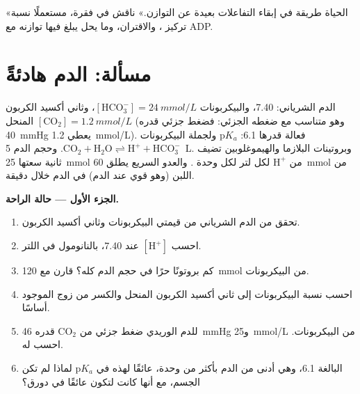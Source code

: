 \begin{exercise}[$\star\star\star$]\label{exo:b1:water-small-molecules:12}
«الحياة طريقة في إبقاء التفاعلات بعيدة عن التوازن.» ناقش في فقرة،
مستعملًا نسبة تركيز ، والاقتران، وما يحل  يبلغ  فيها
توازنه مع ADP.
\end{exercise}

\section{مسألة: الدم هادئةً}

\begin{problem}
\label{pb:b1:water-small-molecules:1}
الدم الشرياني:  7.40، والبيكربونات
$[\mathrm{HCO_3^-}] =
\qty{24}{mmol/L}$، وثاني أكسيد الكربون المنحل
$[\mathrm{CO_2}] =
\qty{1.2}{mmol/L}$ (وهو متناسب مع ضغطه الجزئي:
فضغط جزئي قدره \qty{40}{mmHg} يعطي \qty{1.2}{mmol/L}). ولجملة
البيكربونات p$K_a$ فعالة قدرها 6.1: $\mathrm{CO_2} + \mathrm{H_2O}
\rightleftharpoons \mathrm{H^+} + \mathrm{HCO_3^-}$. وحجم الدم
\qty{5}{L}. وبروتينات البلازما والهيموغلوبين تضيف  ثانية سعتها
\qty{25}{mmol} من $\mathrm{H^+}$ لكل لتر لكل وحدة . والعدو السريع
يطلق \qty{60}{mmol} من  اللبن (وهو  قوي عند  الدم) في الدم
خلال دقيقة.

\medskip
\noindent\textbf{الجزء الأول --- حالة الراحة.}
\begin{enumerate}
  \item تحقق من  الدم الشرياني من قيمتي البيكربونات وثاني أكسيد
        الكربون.
  \item احسب $[\mathrm{H^+}]$ عند  7.40، بالنانومول في اللتر.
  \item كم بروتونًا حرًا في حجم الدم كله؟ قارن مع \qty{120}{mmol} من
        البيكربونات.
  \item احسب نسبة البيكربونات إلى ثاني أكسيد الكربون المنحل والكسر من
        زوج  الموجود أساسًا.
  \item للدم الوريدي ضغط جزئي من $\mathrm{CO_2}$ قدره \qty{46}{mmHg}
        و\qty{25}{mmol/L} من البيكربونات. احسب  له.
  \item لماذا لم تكن p$K_a$ البالغة 6.1، وهي أدنى من  الدم بأكثر من
        وحدة، عائقًا لهذه  في الجسم، مع أنها كانت لتكون عائقًا
        في دورق؟
\end{enumerate}


\end{problem}
